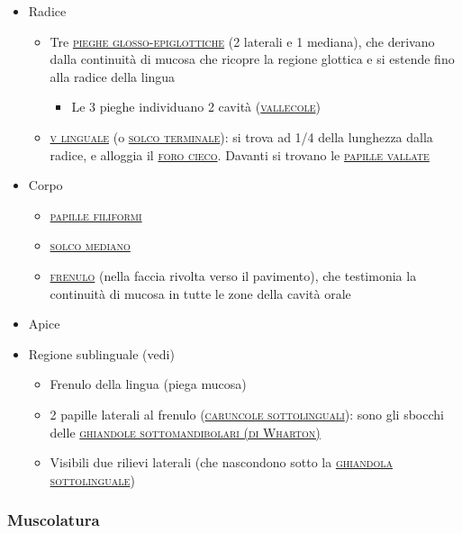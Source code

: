 \documentclass[italian,]{article}
\providecommand{\tightlist}{%
  \setlength{\itemsep}{0pt}\setlength{\parskip}{0pt}}
\renewcommand{\a}[1]{\underline{\textsc{#1}}}
\begin{document}
\begin{itemize}
\tightlist
\item
  Radice

  \begin{itemize}
  \tightlist
  \item
    Tre \a{pieghe glosso-epiglottiche} (2 laterali e 1 mediana), che
    derivano dalla continuità di mucosa che ricopre la regione glottica
    e si estende fino alla radice della lingua

    \begin{itemize}
    \tightlist
    \item
      Le 3 pieghe individuano 2 cavità (\a{vallecole})
    \end{itemize}
  \item
    \a{v linguale} (o \a{solco terminale}): si trova ad 1/4 della
    lunghezza dalla radice, e alloggia il \a{foro cieco}. Davanti si
    trovano le \a{papille vallate}
  \end{itemize}
\item
  Corpo

  \begin{itemize}
  \tightlist
  \item
    \a{papille filiformi}~
  \item
    \a{solco mediano}~
  \item
    \a{frenulo} (nella faccia rivolta verso il pavimento), che
    testimonia la continuità di mucosa in tutte le zone della cavità
    orale
  \end{itemize}
\item
  Apice
\item
  Regione sublinguale (vedi)

  \begin{itemize}
  \tightlist
  \item
    Frenulo della lingua (piega mucosa)
  \item
    2 papille laterali al frenulo (\a{caruncole sottolinguali}): sono
    gli sbocchi delle \a{ghiandole sottomandibolari (di Wharton)}
  \item
    Visibili due rilievi laterali (che nascondono sotto la
    \a{ghiandola sottolinguale})
  \end{itemize}
\end{itemize}

\hypertarget{muscolatura}{%
\subsubsection{Muscolatura}\label{muscolatura}}
\end{document}
